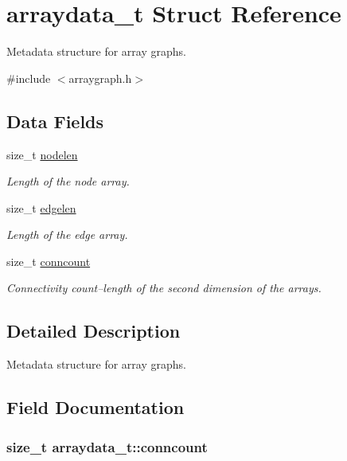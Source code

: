 \hypertarget{structarraydata__t}{}\section{arraydata\+\_\+t Struct Reference}
\label{structarraydata__t}


Metadata structure for array graphs.  




{\ttfamily \#include $<$arraygraph.\+h$>$}

\subsection*{Data Fields}
\begin{DoxyCompactItemize}
\item 
size\+\_\+t \hyperlink{structarraydata__t_ab7b4b6740dd5353c323233dea2e2eaee}{nodelen}
\begin{DoxyCompactList}\small\item\em Length of the node array. \end{DoxyCompactList}\item 
size\+\_\+t \hyperlink{structarraydata__t_a1bcdcd2b541e02eb0d20be0563a1f447}{edgelen}
\begin{DoxyCompactList}\small\item\em Length of the edge array. \end{DoxyCompactList}\item 
size\+\_\+t \hyperlink{structarraydata__t_a84f30a007d02c7b40025284d4fa70e20}{conncount}
\begin{DoxyCompactList}\small\item\em Connectivity count--length of the second dimension of the arrays. \end{DoxyCompactList}\end{DoxyCompactItemize}


\subsection{Detailed Description}
Metadata structure for array graphs. 

\subsection{Field Documentation}
\subsubsection[{\texorpdfstring{conncount}{conncount}}]{\setlength{\rightskip}{0pt plus 5cm}size\+\_\+t arraydata\+\_\+t\+::conncount}\hypertarget{structarraydata__t_a84f30a007d02c7b40025284d4fa70e20}{}\label{structarraydata__t_a84f30a007d02c7b40025284d4fa70e20}


